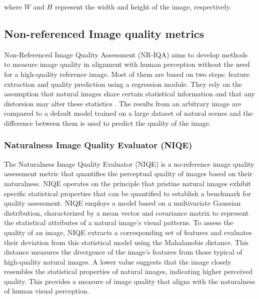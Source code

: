             \noindent where $W$ and $H$ represent the width and height of the image, respectively.
    

    \subsection{Non-referenced Image quality metrics}

    Non-Referenced Image Quality Assessment (NR-IQA) aims to develop methods to measure image quality in alignment with human perception without the need for a high-quality reference image. 
    Most of them are based on two steps: feature extraction and quality prediction using a regression module. 
    They rely on the assumption that natural images share certain statistical information and that any distorsion may alter these statistics \cite{niqe}.
    The results from an arbitrary image are compared to a default model trained on a large dataset of natural scenes and the difference  between them is used to predict the quality of the image.



        

        \subsubsection{Naturalness Image Quality Evaluator (NIQE)}

        
            The Naturalness Image Quality Evaluator (NIQE) \cite{niqe} is a no-reference image quality assessment metric that quantifies the perceptual quality of images based on their naturalness.
            NIQE operates on the principle that pristine natural images exhibit specific statistical properties that can be quantified to establish a benchmark for quality assessment. 
            NIQE employs a model based on a multivariate Gaussian distribution, characterized by a mean vector and covariance matrix to represent the statistical attributes of a natural image's visual patterns.
            To assess the quality of an image, NIQE extracts a corresponding set of features and evaluates their deviation from this statistical model using the Mahalanobis distance.
            This distance measures the divergence of the image's features from those typical of high-quality natural images.
            A lower value suggests that the image closely resembles the statistical properties of natural images, indicating higher perceived quality. This provides a measure of image quality that aligns with the naturalness of human visual perception. 

